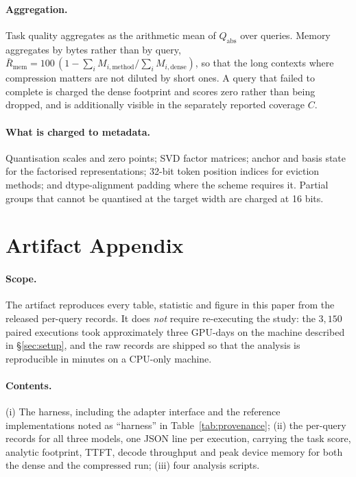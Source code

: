 \documentclass[sigplan,10pt,anonymous,review,nonacm]{acmart}
\begin{document}
\paragraph{Aggregation.} Task quality aggregates as the arithmetic mean of
$Q_{\text{abs}}$ over queries. Memory aggregates by bytes rather than by
query, $\bar{R}_{\text{mem}} = 100\,(1 - \sum_i M_{i,\text{method}} /
\sum_i M_{i,\text{dense}})$, so that the long contexts where compression
matters are not diluted by short ones. A query that failed to complete is
charged the dense footprint and scores zero rather than being dropped, and is
additionally visible in the separately reported coverage $C$.

\paragraph{What is charged to metadata.} Quantisation scales and zero points;
SVD factor matrices; anchor and basis state for the factorised
representations; 32-bit token position indices for eviction methods; and
dtype-alignment padding where the scheme requires it. Partial groups that
cannot be quantised at the target width are charged at 16 bits.

\section{Artifact Appendix}
\label{app:artifact}

\paragraph{Scope.} The artifact reproduces every table, statistic and figure
in this paper from the released per-query records. It does \emph{not} require
re-executing the study: the $3{,}150$ paired executions took approximately
three GPU-days on the machine described in \S\ref{sec:setup}, and the raw
records are shipped so that the analysis is reproducible in minutes on a
CPU-only machine.

\paragraph{Contents.} (i) The harness, including the adapter interface and the
reference implementations noted as ``harness'' in
Table~\ref{tab:provenance}; (ii) the per-query records for all three models,
one JSON line per execution, carrying the task score, analytic footprint,
TTFT, decode throughput and peak device memory for both the dense and the
compressed run; (iii) four analysis scripts.
\end{document}
